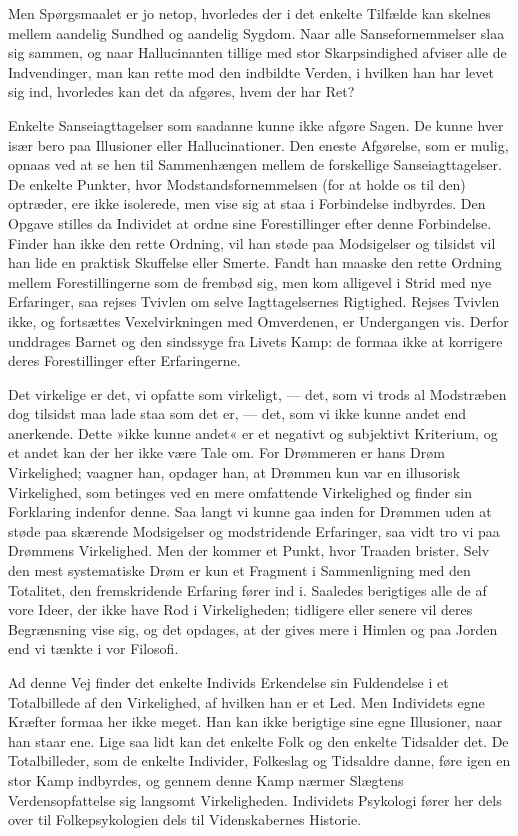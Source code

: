 \documentclass[12pt,a4paper,openany]{book}
\newcommand{\opage}[1]{\marginnote{\footnotesize\textit{[#1]}}}
\begin{document}
Men Spørgsmaalet er jo netop, hvorledes der i det enkelte Tilfælde kan
skelnes mellem aandelig Sundhed og aandelig Sygdom. Naar alle
Sansefornemmelser slaa sig sammen, og naar Hallucinanten tillige med
stor Skarpsindighed afviser alle de Indvendinger, man kan rette mod den
indbildte Verden, i hvilken han har levet sig ind, hvorledes kan det da
afgøres, hvem der har Ret?

Enkelte Sanseiagttagelser som saadanne kunne ikke afgøre Sagen. De kunne
hver især bero paa Illusioner eller Hallucinationer. Den eneste
Afgørelse, som er mulig, opnaas ved at se hen til Sammenhængen mellem de
forskellige Sanseiagttagelser. De enkelte Punkter, hvor
Modstandsfornemmelsen (for at holde os til den) optræder, ere ikke
isolerede, men vise sig at staa i Forbindelse indbyrdes. Den Opgave
stilles da Individet at ordne sine Forestillinger efter denne
Forbindelse. Finder han ikke den rette Ordning, vil han støde paa
Modsigelser og tilsidst vil han lide en praktisk Skuffelse eller Smerte.
Fandt han maaske den rette Ordning mellem Forestillingerne som de
frembød sig, men kom alligevel i Strid med nye Erfaringer, saa rejses
Tvivlen om selve Iagttagelsernes Rigtighed. Rejses Tvivlen ikke, og
fortsættes Vexelvirkningen
\opage{254}med Omverdenen, er Undergangen vis. Derfor unddrages Barnet
og den sindssyge fra Livets Kamp: de formaa ikke at korrigere deres
Forestillinger efter Erfaringerne.

Det virkelige er det, vi opfatte som virkeligt, --- det, som vi trods al
Modstræben dog tilsidst maa lade staa som det er, --- det, som vi ikke
kunne andet end anerkende. Dette »ikke kunne andet« er et negativt og
subjektivt Kriterium, og et andet kan der her ikke være Tale om. For
Drømmeren er hans Drøm Virkelighed; vaagner han, opdager han, at Drømmen
kun var en illusorisk Virkelighed, som betinges ved en mere omfattende
Virkelighed og finder sin Forklaring indenfor denne. Saa langt vi kunne
gaa inden for Drømmen uden at støde paa skærende Modsigelser og
modstridende Erfaringer, saa vidt tro vi paa Drømmens Virkelighed. Men
der kommer et Punkt, hvor Traaden brister. Selv den mest systematiske
Drøm er kun et Fragment i Sammenligning med den Totalitet, den
fremskridende Erfaring fører ind i. Saaledes berigtiges alle de af vore
Ideer, der ikke have Rod i Virkeligheden; tidligere eller senere vil
deres Begrænsning vise sig, og det opdages, at der gives mere i Himlen
og paa Jorden end vi tænkte i vor Filosofi.

Ad denne Vej finder det enkelte Individs Erkendelse sin Fuldendelse i et
Totalbillede af den Virkelighed, af hvilken han er et Led. Men
Individets egne Kræfter formaa her ikke meget. Han kan ikke berigtige
sine egne Illusioner, naar han staar ene. Lige saa lidt kan det enkelte
Folk og den enkelte Tidsalder det. De Totalbilleder, som de enkelte
Individer, Folkeslag og Tidsaldre danne, føre igen en stor Kamp
indbyrdes, og gennem denne Kamp nærmer Slægtens Verdensopfattelse sig
langsomt Virkeligheden. Individets Psykologi fører her dels over til
Folkepsykologien dels til Videnskabernes Historie.
\end{document}
